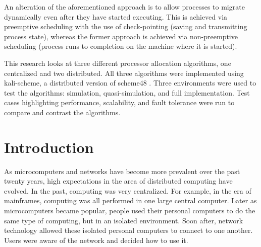 \documentclass{report}
\begin{document}
An alteration of the aforementioned approach is to allow processes to
migrate dynamically even after they have started executing.  This is
achieved via preemptive scheduling with the use of check-pointing (saving and
transmitting process state), whereas the former approach is achieved via
non-preemptive scheduling (process runs to completion on the machine where
it is started).

This research looks at three different processor allocation algorithms, one
centralized and two distributed.  All three algorithms were implemented
using kali-scheme, a distributed version of scheme48 \cite{kali}.  Three
environments were used to test the algorithms: simulation, quasi-simulation,
and full implementation.  Test cases highlighting performance, scalability,
and fault tolerance were run to compare and contrast the algorithms.



\tocpg                       %
\figurespg                   %





\mainpart                    %





\chapter{Introduction}

As microcomputers and networks have become more prevalent over the past
twenty years, high expectations in the area of distributed computing have
evolved.  In the past, computing was very centralized.  For example, in the
era of mainframes, computing was all performed in one large central
computer.  Later as microcomputers became popular, people used their personal
computers to do the same type of computing, but in an isolated environment.
Soon after, network technology allowed these isolated personal computers to
connect to one another.  Users were aware of the network and decided how to
use it.  
\end{document}

